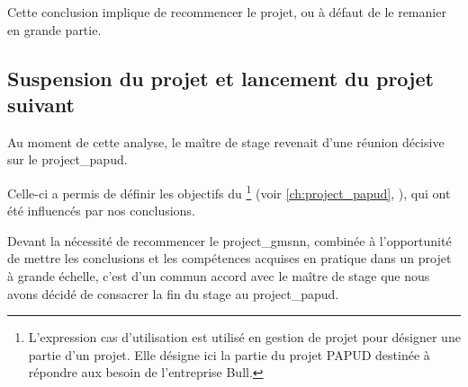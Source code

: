 Cette conclusion implique de recommencer le projet, ou à défaut de le remanier en grande partie.

\subsection{Suspension du projet et lancement du projet suivant}
Au moment de cette analyse, le maître de stage revenait d'une réunion décisive sur le \gls{project_papud}.

Celle-ci a permis de définir les objectifs du \footnote{L'expression \og cas d'utilisation\fg{} est utilisé en gestion de projet pour désigner une partie d'un projet. Elle désigne ici la partie du projet PAPUD destinée à répondre aux besoin de l'entreprise Bull.} (voir \autoref{ch:project_papud}, ), qui ont été influencés par nos conclusions.

Devant la nécessité de recommencer le \gls{project_gmsnn}, combinée à l'opportunité de mettre les conclusions et les compétences acquises en pratique dans un projet à grande échelle, c'est d'un commun accord avec le maître de stage que nous avons décidé de consacrer la fin du stage au \gls{project_papud}.


